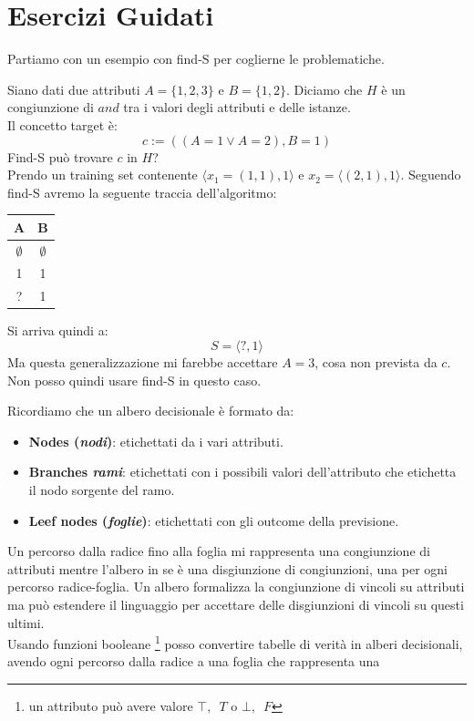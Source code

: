 \section{Esercizi Guidati}
Partiamo con un esempio con find-S per coglierne le problematiche.
\begin{esempio}
  Siano dati due attributi $A=\{1, 2, 3\}$ e $B=\{1, 2\}$. Diciamo che $H$ è un
  congiunzione di $and$ tra i valori degli attributi e delle istanze.\\
  Il concetto target è:
  \[c:=((A=1\lor A=2), B=1)\]
  Find-S può trovare $c$ in $H$?\\
  Prendo un training set contenente $\langle x_1=(1, 1), 1\rangle$ e
  $x_2=\langle(2, 1), 1\rangle$. Seguendo find-S 
  avremo la seguente traccia dell'algoritmo:
  \begin{table}[H]
    \centering
    \begin{tabular}{c|c}
      A & B\\
      \hline
      $\emptyset$ & $\emptyset$\\
      1 & 1 \\
      ? & 1
    \end{tabular}
  \end{table}
  Si arriva quindi a:
  \[S=\langle ?, 1\rangle\]
  Ma questa generalizzazione mi farebbe accettare $A=3$, cosa non prevista da
  $c$.\\
  Non posso quindi usare find-S in questo caso.
\end{esempio}
Ricordiamo che un albero decisionale è formato da:
\begin{itemize}
  \item \textbf{Nodes (\textit{nodi})}: etichettati da i vari attributi.
  \item \textbf{Branches \textit{rami}}: etichettati con i possibili valori
  dell'attributo che etichetta il nodo sorgente del ramo.
  \item \textbf{Leef nodes (\textit{foglie})}: etichettati con gli outcome della
  previsione.
\end{itemize}
Un percorso dalla radice fino alla foglia mi rappresenta una congiunzione di
attributi mentre l'albero in se è una disgiunzione di congiunzioni, una
per ogni percorso radice-foglia. Un albero formalizza la congiunzione di
vincoli su attributi ma può estendere il linguaggio per accettare delle disgiunzioni di vincoli su questi ultimi.\\
Usando funzioni booleane \footnote{un attributo può avere valore $\top,\,\,\, T$ o
$\bot,\,\,\, F$} posso convertire tabelle di verità in alberi decisionali, avendo ogni percorso dalla radice a una foglia che rappresenta una
